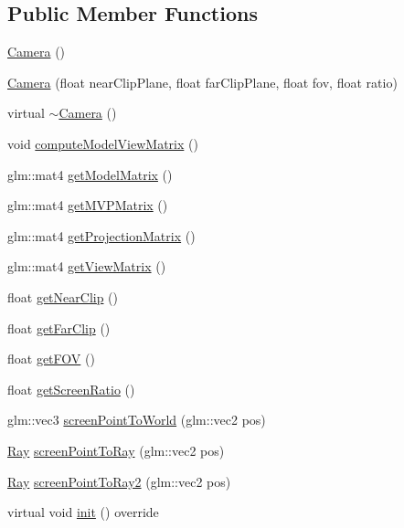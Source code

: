 \subsection*{Public Member Functions}
\begin{DoxyCompactItemize}
\item 
\hyperlink{class_camera_a01f94c3543f56ede7af49dc778f19331}{Camera} ()
\item 
\hyperlink{class_camera_a80beb3602cfdb96013c7acb71de1510b}{Camera} (float near\+Clip\+Plane, float far\+Clip\+Plane, float fov, float ratio)
\item 
virtual \hyperlink{class_camera_ad1897942d0ccf91052386388a497349f}{$\sim$\+Camera} ()
\item 
void \hyperlink{class_camera_aba99909b33d24822c337c09aaabea242}{compute\+Model\+View\+Matrix} ()
\item 
glm\+::mat4 \hyperlink{class_camera_a295d9433395f9dc8ef664614b8024e13}{get\+Model\+Matrix} ()
\item 
glm\+::mat4 \hyperlink{class_camera_a218f84bd3fedb1635241844c95112fa4}{get\+M\+V\+P\+Matrix} ()
\item 
glm\+::mat4 \hyperlink{class_camera_adf09522521723786b9f405c99d6594c7}{get\+Projection\+Matrix} ()
\item 
glm\+::mat4 \hyperlink{class_camera_a5569ca5967e01d3344fbf6aba36d9820}{get\+View\+Matrix} ()
\item 
float \hyperlink{class_camera_a5db47defc06bb2e0b2f5e6297ccb6344}{get\+Near\+Clip} ()
\item 
float \hyperlink{class_camera_a1a5b0c8c2bc2af5c8c6ae47a53010add}{get\+Far\+Clip} ()
\item 
float \hyperlink{class_camera_a5ec1871e6f296d8528e64157c6371c09}{get\+F\+O\+V} ()
\item 
float \hyperlink{class_camera_aef9d5b443588a64ae649ef0d063f72f7}{get\+Screen\+Ratio} ()
\item 
glm\+::vec3 \hyperlink{class_camera_aca6735f228da3a95703a93b732f0eae3}{screen\+Point\+To\+World} (glm\+::vec2 pos)
\item 
\hyperlink{class_ray}{Ray} \hyperlink{class_camera_aed1084771ca34b01476779f024bd6af0}{screen\+Point\+To\+Ray} (glm\+::vec2 pos)
\item 
\hyperlink{class_ray}{Ray} \hyperlink{class_camera_a1cdd077539fbff108015287660570662}{screen\+Point\+To\+Ray2} (glm\+::vec2 pos)
\item 
virtual void \hyperlink{class_camera_aa575c1bbde6ae31425e233f0204af38c}{init} () override
\item 

\end{DoxyCompactItemize}
